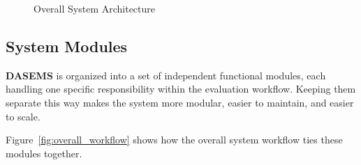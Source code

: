 \begin{figure}[H]

\caption{Overall System Architecture}
\label{fig:system_architecture}

\end{figure}

\subsection{System Modules}

\textbf{DASEMS} is organized into a set of independent functional modules, each handling one specific responsibility within the evaluation workflow. Keeping them separate this way makes the system more modular, easier to maintain, and easier to scale.

Figure~\ref{fig:overall_workflow} shows how the overall system workflow ties these modules together.

